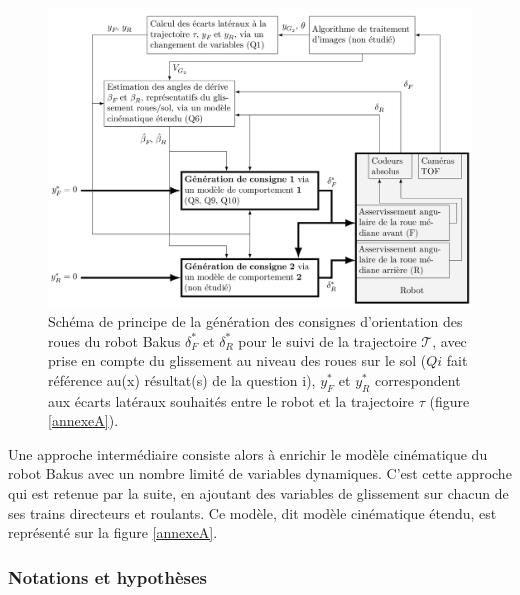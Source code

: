 \begin{figure}[!h]
\centering\includegraphics[width=0.8\linewidth]{img/fig04}
 \caption{Schéma de principe de la génération des consignes d'orientation des roues du robot Bakus $\delta^*_F$ et $\delta^*_R$ pour le suivi de la trajectoire $\mathcal{T}$, avec prise en compte du glissement au niveau des roues sur le sol ($Qi$ fait référence au(x) résultat(s) de la question i), $y^*_F$ et $y^*_R$ correspondent aux écarts latéraux souhaités entre le robot et la trajectoire $\tau$ (figure \ref{annexeA}).}
 \label{img04}
\end{figure}

Une approche intermédiaire consiste alors à enrichir le modèle cinématique du robot Bakus avec un nombre limité de variables dynamiques. C'est cette approche qui est retenue par la suite, en ajoutant des variables
de glissement sur chacun de ses trains directeurs et roulants. Ce modèle, dit modèle cinématique étendu, est représenté sur la figure \ref{annexeA}.

\subsubsection{Notations et hypothèses}

